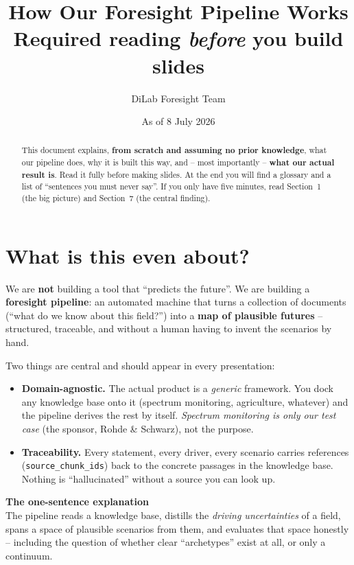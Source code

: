 \documentclass[11pt,a4paper]{article}
\title{\vspace{-1.2cm}\textbf{How Our Foresight Pipeline Works}\\[4pt]
  \large Required reading \textit{before} you build slides}
\author{DiLab Foresight Team}
\date{As of 8 July 2026}
\newcommand{\callout}[3]{\par\smallskip\noindent
  \colorbox{#1}{\parbox{\dimexpr\linewidth-2\fboxsep\relax}{%
  \textbf{#2}\\[2pt]#3}}\par\smallskip}
\newcommand{\key}[2]{\callout{keybg}{#1}{#2}}
\newcommand{\code}[1]{\texttt{\small #1}}
\begin{document}
\maketitle
\thispagestyle{fancy}

\begin{abstract}
\noindent This document explains, \textbf{from scratch and assuming no prior knowledge}, what our
pipeline does, why it is built this way, and -- most importantly -- \textbf{what our actual result is}.
Read it fully before making slides. At the end you will find a glossary and a list of
\enquote{sentences you must never say}. If you only have five minutes, read Section~1 (the big picture)
and Section~7 (the central finding).
\end{abstract}

\tableofcontents
\vspace{4mm}

\section{What is this even about?}

We are \textbf{not} building a tool that \enquote{predicts the future}. We are building a
\textbf{foresight pipeline}: an automated machine that turns a collection of documents
(\enquote{what do we know about this field?}) into a \textbf{map of plausible futures} --
structured, traceable, and without a human having to invent the scenarios by hand.

Two things are central and should appear in every presentation:

\begin{itemize}
  \item \textbf{Domain-agnostic.} The actual product is a \emph{generic} framework. You dock any
  knowledge base onto it (spectrum monitoring, agriculture, whatever) and the pipeline derives the rest
  by itself. \emph{Spectrum monitoring is only our test case} (the sponsor, Rohde \& Schwarz), not the
  purpose.
  \item \textbf{Traceability.} Every statement, every driver, every scenario carries references
  (\code{source\_chunk\_ids}) back to the concrete passages in the knowledge base. Nothing is
  \enquote{hallucinated} without a source you can look up.
\end{itemize}

\key{The one-sentence explanation}{The pipeline reads a knowledge base, distills the \emph{driving
uncertainties} of a field, spans a space of plausible scenarios from them, and evaluates that space
honestly -- including the question of whether clear \enquote{archetypes} exist at all, or only a
continuum.}
\end{document}
